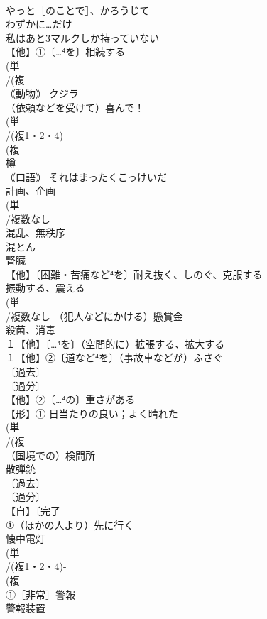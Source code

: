 \documentclass[8pt]{extreport}
\begin{document}
\begin{CJK}{UTF8}{min}
\\	やっと［のことで］、かろうじて
\\	わずかに…だけ 
\\	私はあと3マルクしか持っていない
\\	【他】①〔…⁴を〕相続する 
\\	(単
\\	/(複
\\	｟動物｠ クジラ
\\	（依頼などを受けて）喜んで！
\\	(単
\\	/(複1・2・4)
\\	(複
\\	樽 
\\	｟口語｠ それはまったくこっけいだ
\\	計画、企画
\\	(単
\\	/複数なし　
\\	混乱、無秩序　
\\	混とん 
\\	腎臓 
\\	【他】〔困難・苦痛など⁴を〕耐え抜く、しのぐ、克服する 
\\	振動する、震える 
\\	(単
\\	/複数なし （犯人などにかける）懸賞金
\\	殺菌、消毒
\\	１【他】〔…⁴を〕（空間的に）拡張する、拡大する 
\\	１【他】②〔道など⁴を〕（事故車などが）ふさぐ
\\	〔過去〕
\\	〔過分〕
\\	【他】②〔…⁴の〕重さがある
\\	【形】① 日当たりの良い；よく晴れた 
\\	(単
\\	/(複
\\	（国境での）検問所
\\	散弾銃 
\\	〔過去〕
\\	〔過分〕
\\	【自】〔完了
\\	①（ほかの人より）先に行く
\\	懐中電灯
\\	(単
\\	/(複1・2・4)-
\\	(複
\\	①［非常］警報 
\\	警報装置

\end{CJK}
\end{document}
